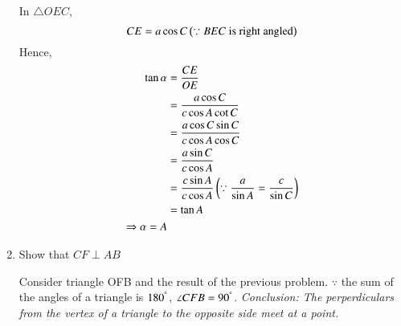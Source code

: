 \begin{enumerate}[label=\arabic*.,ref=\thesubsection.\theenumi]
\solution In $\triangle OEC$,
%
\begin{equation}
CE = a \cos C \left(\because BEC \text{ is right angled}\right)
\end{equation}
%
Hence,
%
\begin{equation}
\begin{split}
\tan \alpha &= \frac{CE}{OE} \\
&=  \frac{a \cos C}{c \cos A \cot C} \\
&=  \frac{a \cos C \sin C}{c \cos A \cos C} \\
&= \frac{a \sin C}{c \cos A } \\
&= \frac{c \sin A}{c \cos A } \left(\because \frac{a}{\sin A} = \frac{c}{\sin C}\right)\\
&= \tan A\\
\Rightarrow \alpha = A
\end{split}
\end{equation}
%
\item
	Show that $CF \perp AB$

\solution Consider triangle OFB and the result of the previous problem.  $\because$ the sum of the angles of a triangle is $180^{\degree}$, $\angle CFB = 90^{\degree}$.
{\em Conclusion: The perperdiculars from the vertex of a triangle to the opposite side meet at a point.}
\end{enumerate}
